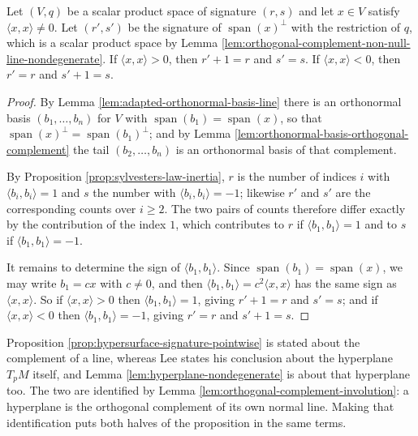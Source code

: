 \begin{proposition}
\label{prop:hypersurface-signature-pointwise}
\leanok
{}
Let $(V,q)$ be a scalar product space of signature $(r,s)$ and let $x \in V$ satisfy $\langle x,x\rangle \neq 0$. Let $(r',s')$ be the signature of $\operatorname{span}(x)^\perp$ with the restriction of $q$, which is a scalar product space by Lemma \ref{lem:orthogonal-complement-non-null-line-nondegenerate}. If $\langle x,x\rangle > 0$, then $r' + 1 = r$ and $s' = s$. If $\langle x,x \rangle < 0$, then $r' = r$ and $s' + 1 = s$.
\end{proposition}

\begin{proof}
\leanok
{}
By Lemma \ref{lem:adapted-orthonormal-basis-line} there is an orthonormal basis $(b_1,\ldots,b_n)$ for $V$ with $\operatorname{span}(b_1) = \operatorname{span}(x)$, so that $\operatorname{span}(x)^\perp = \operatorname{span}(b_1)^\perp$; and by Lemma \ref{lem:orthonormal-basis-orthogonal-complement} the tail $(b_2,\ldots,b_n)$ is an orthonormal basis of that complement.

By Proposition \ref{prop:sylvesters-law-inertia}, $r$ is the number of indices $i$ with $\langle b_i,b_i\rangle = 1$ and $s$ the number with $\langle b_i,b_i \rangle = -1$; likewise $r'$ and $s'$ are the corresponding counts over $i \geq 2$. The two pairs of counts therefore differ exactly by the contribution of the index $1$, which contributes to $r$ if $\langle b_1,b_1\rangle = 1$ and to $s$ if $\langle b_1,b_1 \rangle = -1$.

It remains to determine the sign of $\langle b_1, b_1 \rangle$. Since $\operatorname{span}(b_1) = \operatorname{span}(x)$, we may write $b_1 = cx$ with $c \neq 0$, and then $\langle b_1,b_1\rangle = c^2 \langle x,x\rangle$ has the same sign as $\langle x,x \rangle$. So if $\langle x,x\rangle > 0$ then $\langle b_1,b_1\rangle = 1$, giving $r' + 1 = r$ and $s' = s$; and if $\langle x,x\rangle < 0$ then $\langle b_1,b_1\rangle = -1$, giving $r' = r$ and $s' + 1 = s$.
\end{proof}

Proposition \ref{prop:hypersurface-signature-pointwise} is stated about the complement of a line, whereas Lee states his conclusion about the hyperplane $T_pM$ itself, and Lemma \ref{lem:hyperplane-nondegenerate} is about that hyperplane too. The two are identified by Lemma \ref{lem:orthogonal-complement-involution}: a hyperplane is the orthogonal complement of its own normal line. Making that identification puts both halves of the proposition in the same terms.

